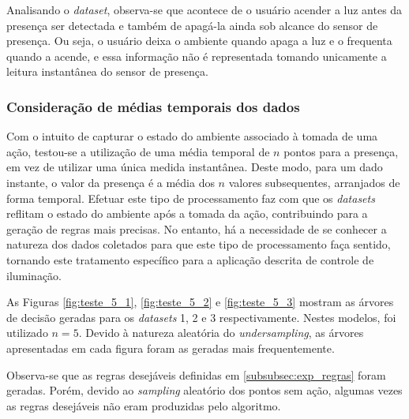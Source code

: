 Analisando o \textit{dataset}, observa-se que acontece de o usuário acender a luz antes da presença ser detectada e também de apagá-la ainda sob alcance do sensor de presença. Ou seja, o usuário deixa o ambiente quando apaga a luz e o frequenta quando a acende, e essa informação não é representada tomando unicamente a leitura instantânea do sensor de presença.

\clearpage

\subsubsection{Consideração de médias temporais dos dados} \label{subsubsec:presence_mean}
Com o intuito de capturar o estado do ambiente associado à tomada de uma ação, testou-se a utilização de uma média temporal de $n$ pontos para a presença, em vez de utilizar uma única medida instantânea. Deste modo, para um dado instante, o valor da presença é a média dos $n$ valores subsequentes, arranjados de forma temporal. Efetuar este tipo de processamento faz com que os \textit{datasets} reflitam o estado do ambiente após a tomada da ação, contribuindo para a geração de regras mais precisas. No entanto, há a necessidade de se conhecer a natureza dos dados coletados para que este tipo de processamento faça sentido, tornando este tratamento específico para a aplicação descrita de controle de iluminação.

As Figuras \ref{fig:teste_5_1}, \ref{fig:teste_5_2} e \ref{fig:teste_5_3} mostram as árvores de decisão geradas para os \textit{datasets} 1, 2 e 3 respectivamente. Nestes modelos, foi utilizado $n=5$. Devido à natureza aleatória do \textit{undersampling}, as árvores apresentadas em cada figura foram as geradas mais frequentemente.

Observa-se que as regras desejáveis definidas em \ref{subsubsec:exp_regras} foram geradas. Porém, devido ao \textit{sampling} aleatório dos pontos sem ação, algumas vezes as regras desejáveis não eram produzidas pelo algoritmo.

